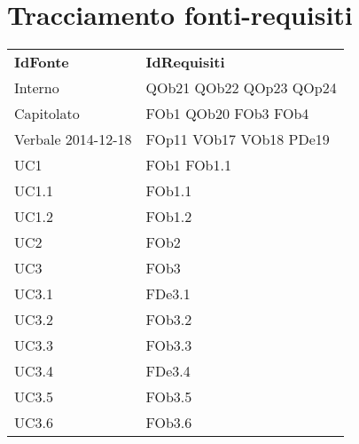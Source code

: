 \section{Tracciamento fonti-requisiti}
\begin{longtable}{|l|p{4cm}|}
\hline
\textbf{IdFonte} & \textbf{IdRequisiti} \\ 
Interno & QOb21 \linebreak  QOb22 \linebreak  QOp23 \linebreak  QOp24 \linebreak   \\ 
\hline
Capitolato & FOb1 \linebreak  QOb20 \linebreak  FOb3 \linebreak  FOb4 \linebreak   \\ 
\hline
		Verbale 2014-12-18 & FOp11 \linebreak  VOb17 \linebreak  VOb18 \linebreak  PDe19 \linebreak   \\
\hline
		UC1 & FOb1 \linebreak  FOb1.1 \linebreak   \\
\hline
		UC1.1 & FOb1.1 \linebreak   \\
\hline
		UC1.2 & FOb1.2 \linebreak   \\
\hline
		UC2 & FOb2 \linebreak   \\
\hline
		UC3 & FOb3 \linebreak   \\
\hline
		UC3.1 & FDe3.1 \linebreak   \\
\hline
		UC3.2 & FOb3.2 \linebreak   \\
\hline
		UC3.3 & FOb3.3 \linebreak   \\
\hline
		UC3.4 & FDe3.4 \linebreak   \\
\hline
		UC3.5 & FOb3.5 \linebreak   \\
\hline
		UC3.6 & FOb3.6 \linebreak   \\

\end{longtable}
